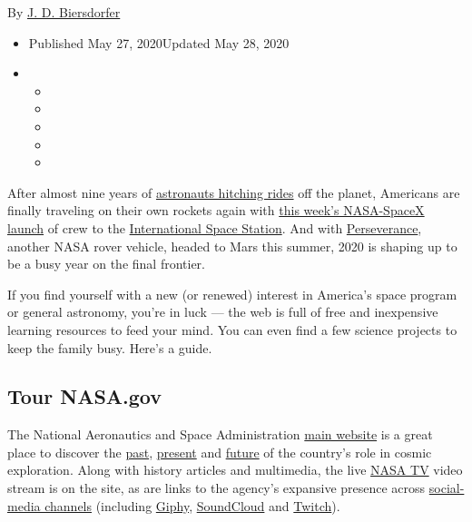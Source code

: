 By \href{https://www.nytimes3xbfgragh.onion/by/j-d-biersdorfer}{J. D.
Biersdorfer}

\begin{itemize}
\item
  Published May 27, 2020Updated May 28, 2020
\item
  \begin{itemize}
  \item
  \item
  \item
  \item
  \item
  \end{itemize}
\end{itemize}

After almost nine years of
\href{https://www.nytimes3xbfgragh.onion/2020/04/17/science/spacex-nasa-crew-dragon.html}{astronauts
hitching rides} off the planet, Americans are finally traveling on their
own rockets again with
\href{https://www.nytimes3xbfgragh.onion/2020/05/22/science/spacex-nasa-launch.html}{this
week's NASA-SpaceX launch} of crew to the
\href{https://www.nasa.gov/mission_pages/station/main/index.html}{International
Space Station}. And with
\href{https://www.nasa.gov/perseverance}{Perseverance}, another NASA
rover vehicle, headed to Mars this summer, 2020 is shaping up to be a
busy year on the final frontier.

If you find yourself with a new (or renewed) interest in America's space
program or general astronomy, you're in luck --- the web is full of free
and inexpensive learning resources to feed your mind. You can even find
a few science projects to keep the family busy. Here's a guide.

\hypertarget{tour-nasagov}{%
\subsection{Tour NASA.gov}\label{tour-nasagov}}

The National Aeronautics and Space Administration
\href{https://www.nasa.gov}{main website} is a great place to discover
the \href{https://www.nasa.gov/topics/history/index.html}{past},
\href{https://www.nasa.gov/news/releases/latest/index.html}{present} and
\href{https://www.nasa.gov/launchschedule/}{future} of the country's
role in cosmic exploration. Along with history articles and multimedia,
the live
\href{https://www.nasa.gov/multimedia/nasatv/index.html\#public}{NASA
TV} video stream is on the site, as are links to the agency's expansive
presence across \href{https://www.nasa.gov/socialmedia}{social-media
channels} (including \href{https://giphy.com/nasa}{Giphy},
\href{https://soundcloud.com/nasa}{SoundCloud} and
\href{https://www.twitch.tv/nasa/}{Twitch}).

